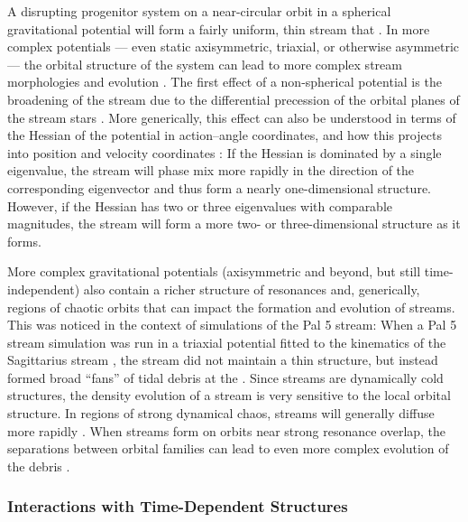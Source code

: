 \documentclass[final,5p,times,twocolumn,authoryear]{elsarticle}
\begin{document}
A disrupting progenitor system on a near-circular orbit in a spherical gravitational
potential will form a fairly uniform, thin stream that .
In more complex potentials --- even static axisymmetric, triaxial, or otherwise
asymmetric --- the orbital structure of the system can lead to more complex stream
morphologies and evolution \citep[e.g.,][]{amorisco:2015b}.
The first effect of a non-spherical potential is the broadening of the stream due to the
differential precession of the orbital planes of the stream stars \citep{erkal:2016b}.
More generically, this effect can also be understood in terms of the Hessian of the
potential in action--angle coordinates, and how this projects into position and velocity
coordinates \citep{sanders:2013a}: If the Hessian is dominated by a single eigenvalue,
the stream will phase mix more rapidly in the direction of the corresponding eigenvector
and thus form a nearly one-dimensional structure.
However, if the Hessian has two or three eigenvalues with comparable magnitudes, the
stream will form a more two- or three-dimensional structure as it forms.

More complex gravitational potentials (axisymmetric and beyond, but still
time-independent) also contain a richer structure of resonances and, generically,
regions of chaotic orbits that can impact the formation and evolution of streams.
This was noticed in the context of simulations of the Pal 5 stream: When a Pal 5 stream
simulation was run in a triaxial potential fitted to the kinematics of the Sagittarius
stream \citep{law:2010}, the stream did not maintain a thin structure, but instead
formed broad ``fans'' of tidal debris at the  \citep{pearson:2015}.
Since streams are dynamically cold structures, the density evolution of a stream is very
sensitive to the local orbital structure.
In regions of strong dynamical chaos, streams will generally diffuse more rapidly
\citep{price-whelan:2016a, mestre:2020}.
When streams form on orbits near strong resonance overlap, the separations between
orbital families can lead to even more complex evolution of the debris
\citep{yavetz:2021,yavetz:2023}.


\subsubsection{Interactions with Time-Dependent Structures}
\end{document}
